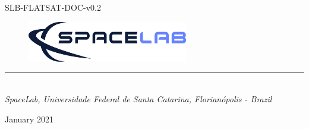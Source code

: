 %
%
%
%
%

%
%
%
%
%
%

\begin{titlepage}

\thispagestyle{empty}

\begin{flushleft}
SLB-FLATSAT-DOC-v0.2
\end{flushleft}

\vspace{1cm}

\begin{figure}[!ht]
    \begin{flushleft}
        \includegraphics[width=7cm]{figures/spacelab_logo_full_color_rgb_1000px_72ppi.png}
    \end{flushleft}
\end{figure}

\begin{flushleft}
\Huge{\textbf{\thetitle}}
\rule[0pt]{\textwidth}{5pt}
\end{flushleft}

\vspace{0.2cm}

\begin{flushleft}
\textit{\thetitle} \\
\textit{SpaceLab, Universidade Federal de Santa Catarina, Florianópolis - Brazil}
\end{flushleft}

\vfill
\vfill

\begin{flushright}
January 2021
\end{flushright}

\end{titlepage}
